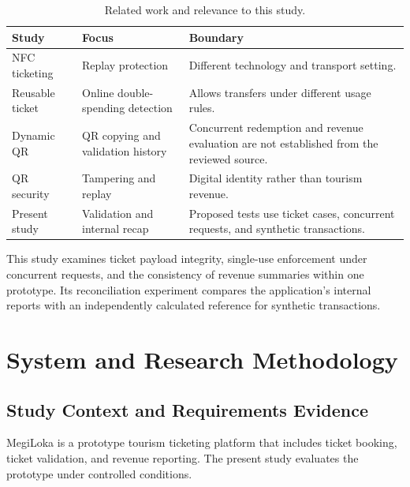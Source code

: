 \documentclass[runningheads]{llncs}
\begin{document}
\begin{table}
\caption{Related work and relevance to this study.}
\label{tab:related-comparison}
\centering
\begin{tabular}{|p{2.4cm}|p{3.0cm}|p{4.0cm}|}
\hline
\textbf{Study} & \textbf{Focus} & \textbf{Boundary} \\
\hline
NFC ticketing~\cite{ref_nfc_ticketing} & Replay protection &
Different technology and transport setting. \\
\hline
Reusable ticket~\cite{ref_reusable_ticket} & Online double-spending
detection & Allows transfers under different usage rules. \\
\hline
Dynamic QR~\cite{ref_dynamic_qr} & QR copying and validation history &
Concurrent redemption and revenue evaluation are not established
from the reviewed source. \\
\hline
QR security~\cite{ref_qr_security} & Tampering and replay &
Digital identity rather than tourism revenue. \\
\hline
Present study & Validation and internal recap & Proposed tests use
ticket cases, concurrent requests, and synthetic transactions. \\
\hline
\end{tabular}
\end{table}

This study examines ticket payload integrity, single-use enforcement
under concurrent requests, and the consistency of revenue summaries
within one prototype. Its reconciliation experiment compares the
application's internal reports with an independently calculated
reference for synthetic transactions.


\section{System and Research Methodology}

\subsection{Study Context and Requirements Evidence}

MegiLoka is a prototype tourism ticketing platform that includes
ticket booking, ticket validation, and revenue reporting. The present
study evaluates the prototype under controlled conditions.
\end{document}
